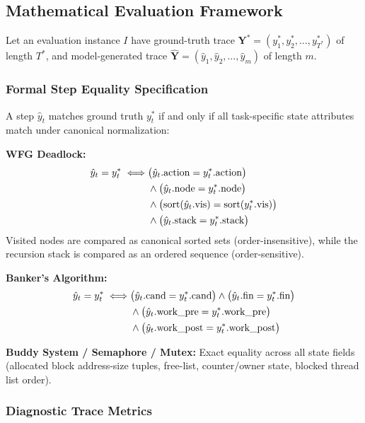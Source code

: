 \documentclass[conference]{IEEEtran}
\begin{document}
\subsection{Mathematical Evaluation Framework}

Let an evaluation instance $I$ have ground-truth trace
$\mathbf{Y}^* = (y_1^*, y_2^*, \dots, y_{T^*}^*)$ of length $T^*$, and model-generated
trace $\hat{\mathbf{Y}} = (\hat{y}_1, \hat{y}_2, \dots, \hat{y}_m)$ of length $m$.

\subsubsection{Formal Step Equality Specification}

A step $\hat{y}_t$ matches ground truth $y_t^*$ if and only if all task-specific state
attributes match under canonical normalization:

\textbf{WFG Deadlock:}
\begin{align}
\hat{y}_t = y_t^* \iff
  &\bigl(\hat{y}_t.\text{action} = y_t^*.\text{action}\bigr) \notag\\
  &\land \bigl(\hat{y}_t.\text{node} = y_t^*.\text{node}\bigr) \notag\\
  &\land \bigl(\mathrm{sort}(\hat{y}_t.\text{vis}) = \mathrm{sort}(y_t^*.\text{vis})\bigr) \notag\\
  &\land \bigl(\hat{y}_t.\text{stack} = y_t^*.\text{stack}\bigr)
\end{align}
Visited nodes are compared as canonical sorted sets (order-insensitive), while the
recursion stack is compared as an ordered sequence (order-sensitive).

\textbf{Banker's Algorithm:}
\begin{align}
\hat{y}_t = y_t^* \iff
  &\bigl(\hat{y}_t.\text{cand} = y_t^*.\text{cand}\bigr) \land \bigl(\hat{y}_t.\text{fin} = y_t^*.\text{fin}\bigr) \notag\\
  &\land \bigl(\hat{y}_t.\text{work\_pre} = y_t^*.\text{work\_pre}\bigr) \notag\\
  &\land \bigl(\hat{y}_t.\text{work\_post} = y_t^*.\text{work\_post}\bigr)
\end{align}

\textbf{Buddy System / Semaphore / Mutex:} Exact equality across all state fields
(allocated block address-size tuples, free-list, counter/owner state, blocked thread
list order).

\subsubsection{Diagnostic Trace Metrics}
\end{document}
